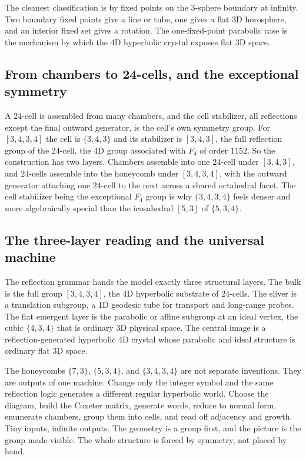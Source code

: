 The cleanest classification is by fixed points on the $3$-sphere boundary at infinity. Two boundary fixed points give a line or tube, one gives a flat 3D horosphere, and an interior fixed set gives a rotation. The one-fixed-point parabolic case is the mechanism by which the 4D hyperbolic crystal exposes flat 3D space.

\subsection{From chambers to 24-cells, and the exceptional symmetry}

A $24$-cell is assembled from many chambers, and the cell stabilizer, all reflections except the final outward generator, is the cell's own symmetry group. For $[3,4,3,4]$ the cell is $\{3,4,3\}$ and its stabilizer is $[3,4,3]$, the full reflection group of the $24$-cell, the 4D group associated with $F_4$ of order $1152$. So the construction has two layers. Chambers assemble into one $24$-cell under $[3,4,3]$, and $24$-cells assemble into the honeycomb under $[3,4,3,4]$, with the outward generator attaching one $24$-cell to the next across a shared octahedral facet. The cell stabilizer being the exceptional $F_4$ group is why $\{3,4,3,4\}$ feels denser and more algebraically special than the icosahedral $[5,3]$ of $\{5,3,4\}$.

\subsection{The three-layer reading and the universal machine}

The reflection grammar hands the model exactly three structural layers. The bulk is the full group $[3,4,3,4]$, the 4D hyperbolic substrate of $24$-cells. The sliver is a translation subgroup, a 1D geodesic tube for transport and long-range probes. The flat emergent layer is the parabolic or affine subgroup at an ideal vertex, the cubic $\{4,3,4\}$ that is ordinary 3D physical space. The central image is a reflection-generated hyperbolic 4D crystal whose parabolic and ideal structure is ordinary flat 3D space.

The honeycombs $\{7,3\}$, $\{5,3,4\}$, and $\{3,4,3,4\}$ are not separate inventions. They are outputs of one machine. Change only the integer symbol and the same reflection logic generates a different regular hyperbolic world. Choose the diagram, build the Coxeter matrix, generate words, reduce to normal form, enumerate chambers, group them into cells, and read off adjacency and growth. Tiny inputs, infinite outputs. The geometry is a group first, and the picture is the group made visible. The whole structure is forced by symmetry, not placed by hand.
